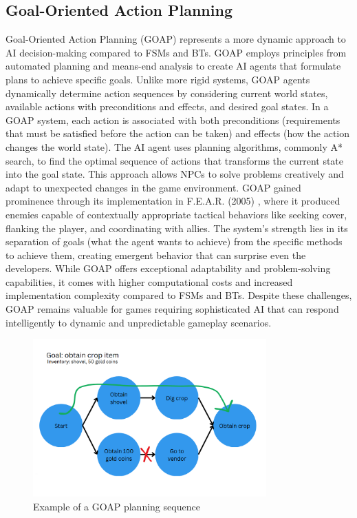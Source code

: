\subsection{Goal-Oriented Action Planning}

Goal-Oriented Action Planning (GOAP) represents a more dynamic approach to AI decision-making compared to FSMs and BTs. 
GOAP employs principles from automated planning and means-end analysis to create AI agents that formulate plans to achieve specific goals. Unlike more rigid systems, GOAP agents dynamically determine action sequences by considering current world states, available actions with preconditions and effects, and desired goal states.
In a GOAP system, each action is associated with both preconditions (requirements that must be satisfied before the action can be taken) and effects (how the action changes the world state).
The AI agent uses planning algorithms, commonly A* search, to find the optimal sequence of actions that transforms the current state into the goal state. 
This approach allows NPCs to solve problems creatively and adapt to unexpected changes in the game environment.
GOAP gained prominence through its implementation in F.E.A.R. (2005) \cite{thompson2020fear}, where it produced enemies capable of contextually appropriate tactical behaviors like seeking cover, flanking the player, and coordinating with allies. 
The system's strength lies in its separation of goals (what the agent wants to achieve) from the specific methods to achieve them, creating emergent behavior that can surprise even the developers.
While GOAP offers exceptional adaptability and problem-solving capabilities, it comes with higher computational costs and increased implementation complexity compared to FSMs and BTs. Despite these challenges, GOAP remains valuable for games requiring sophisticated AI that can respond intelligently to dynamic and unpredictable gameplay scenarios.

\begin{figure}[H]
    \centering
    \includegraphics[width=0.8\textwidth]{figures/goap.png}
    \caption{Example of a GOAP planning sequence}
    \label{fig:goap}
\end{figure}

